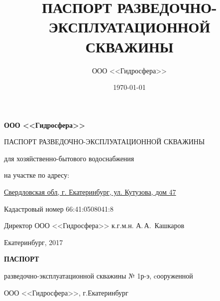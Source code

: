 \documentclass[a4paper,12pt]{article} %
\author{ООО <<Гидросфера>>}\label{company}
\title{ПАСПОРТ РАЗВЕДОЧНО-ЭКСПЛУАТАЦИОННОЙ СКВАЖИНЫ}
\date{\today}
\newcommand{\txtExecutor}{ООО <<Гидросфера>>}			%
\newcommand{\txtYear}{2017}			%
\newcommand{\txtNumber}{№ 1р-э}  					%
\newcommand{\txtAddress}{Свердловская обл, г. Екатеринбург, ул. Кутузова, дом 47}
\newcommand{\txtCadaster}{66:41:0508041:8} 			%
\begin{document}


\begin{titlepage}
	\begin{center}
		\textbf{\txtExecutor}
		\vspace{5.5cm}
		
		{\LARGE ПАСПОРТ РАЗВЕДОЧНО-ЭКСПЛУАТАЦИОННОЙ СКВАЖИНЫ}
		\vspace{0.25cm}
		
		для хозяйственно-бытового водоснабжения
		
		\bigskip
		
		на участке по адресу:
				
		\underline{\txtAddress}
		
		\bigskip
		Кадастровый номер \txtCadaster
		
		\vfill
	
		\bigskip
		
	\end{center}

	\vfill
	
	\newlength{\ML}
	\hfill
	\begin{minipage}{1.0\textwidth}
		Директор ООО <<Гидросфера>> к.г.м.н.
		\underline{\hspace{\ML}} А.\,А.~Кашкаров\\
	\end{minipage}%
	
	\bigskip
	
	\vfill
	\begin{center}
		Екатеринбург, \txtYear
	\end{center}			

	\end{titlepage}


	\begin{center}
		\textbf{ПАСПОРТ}

		разведочно-эксплуатационной скважины \txtNumber, cооруженной 

		\txtExecutor, г.Екатеринбург

	\end{center}


	\bigskip
	
\end{document}
